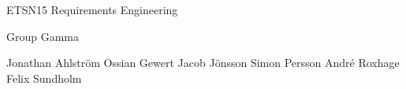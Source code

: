 ETSN15 Requirements Engineering

Group Gamma

Jonathan Ahlström
Ossian Gewert
Jacob Jönsson
Simon Persson
André Roxhage
Felix Sundholm
